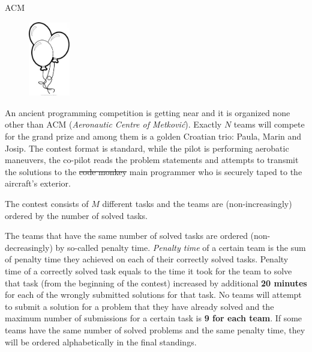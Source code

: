 \begin{statement}[
  problempoints=50,
  timelimit=1 second,
  memorylimit=512 MiB,
]{ACM}

\setlength\intextsep{-0.1cm}
\begin{figure}
\centering
\includegraphics[width=0.16\textwidth]{img/balloon.jpeg}
\end{figure}


An ancient programming competition is getting near and it is organized
none other than ACM (\textit{Aeronautic Centre of Metković}). Exactly
$N$ teams will compete for the grand prize and among them is a golden
Croatian trio: Paula, Marin and Josip. The contest format is standard,
while the pilot is performing aerobatic maneuvers, the co-pilot reads the
problem statements and attempts to transmit the solutions to the
\sout{code monkey} main programmer who is securely taped to the aircraft's
exterior.

The contest consists of $M$ different tasks and the teams are (non-increasingly)
ordered by the number of solved tasks.


The teams that have the same number of solved tasks are ordered
(non-decreasingly) by so-called penalty time. \textit{Penalty time} of a
certain team is the sum of penalty time they achieved on each of
their correctly solved tasks.  Penalty time of a correctly solved task equals
to the time it took for the team to solve that task (from the beginning of
the contest) increased by additional \textbf{20 minutes} for each of the
wrongly submitted solutions for that task. No teams will attempt to submit a
solution for a problem that they have already solved and the maximum number
of submissions for a certain task is \textbf{9 for each team}.  If some teams
have the same number of solved problems and the same penalty time, they will
be ordered alphabetically in the final standings.


\end{statement}
